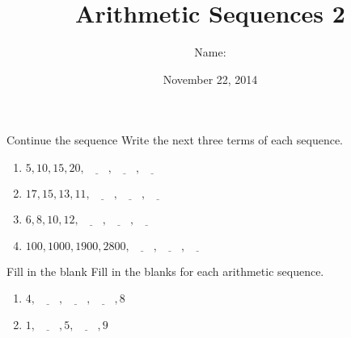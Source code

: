 \documentclass[12pt,letterpaper]{article}
\title{Arithmetic Sequences 2}
\author{Name: \underline{\hspace{5cm}}}
\date{November 22, 2014}
\begin{document}
\maketitle

\thispagestyle{empty}

\begin{problem}{Continue the sequence}
 Write the next three terms of each sequence.

\begin{enumerate}[\hspace{.5cm}a.]
\item $5, 10, 15, 20, \underline{\hspace{2em}}, \underline{\hspace{2em}},
\underline{\hspace{2em}}$
\item $17, 15, 13, 11, \underline{\hspace{2em}},
\underline{\hspace{2em}}, \underline{\hspace{2em}}$
\item $6, 8, 10, 12,
\underline{\hspace{2em}}, \underline{\hspace{2em}}, \underline{\hspace{2em}}$
\item $100, 1000, 1900, 2800, \underline{\hspace{2em}},
\underline{\hspace{2em}}, \underline{\hspace{2em}}$ \end{enumerate}
\end{problem}

\begin{problem}{Fill in the blank}
 Fill in the blanks for each arithmetic sequence.

\begin{enumerate}[\hspace{.5cm}a.]
\item $4, \underline{\hspace{2em}}, \underline{\hspace{2em}}, \underline{\hspace{2em}}, 8$
\item $1, \underline{\hspace{2em}}, 5, \underline{\hspace{2em}}, 9$
\end{enumerate}
\end{problem}
\end{document}

